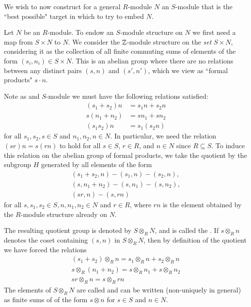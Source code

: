 \documentclass[12pt, a4paper, oneside, openright, titlepage]{book}
\begin{document}
We wish to now construct for a general $R$-module $N$ an $S$-module that is the ``best possible" target in which to try to embed $N$.

\begin{cons}
    Let $N$ be an $R$-module. To endow an $S$-module structure on $N$ we first need a map from $S\times N$ to $N$. We consider the $\mathbb Z$-module structure on the \emph{set} $S\times N$, considering it as the collection of all finite commuting sums of elements of the form $(s_i,n_i) \in S\times N$. This is an abelian group where there are no relations between any distinct pairs $(s,n)$ and $(s',n')$, which we view as ``formal products" $s\cdot n$. 

    Note as and $S$-module we must have the following relations satisfied: \begin{align*}
        (s_1+s_2)n &= s_1n+s_2n \\
        s(n_1+n_2) &= sn_1+sn_2 \\
        (s_1s_2)n &= s_1(s_2n)
    \end{align*}
    for all $s_1,s_2,s \in S$ and $n_1,n_2,n \in N$. In particular, we need the relation $(sr)n = s(rn)$ to hold for all $s \in S$, $r \in R$, and $n \in N$ since $R \subseteq S$. To induce this relation on the abelian group of formal products, we take the quotient by the subgroup $H$ generated by all elements of the form \begin{equation*}
        \begin{array}{c}
            (s_1+s_2,n) - (s_1,n) - (s_2,n), \\
            (s,n_1+n_2) - (s,n_1) - (s,n_2), \\
            (sr,n) - (s,rn) 
        \end{array}
    \end{equation*}
    for all $s,s_1,s_2 \in S, n, n_1,n_2 \in N$ and $r \in R$, where $rn$ is the element obtained by the $R$-module structure already on $N$.


    The resulting quotient group is denoted by $S\otimes_R N$, and is called the . If $s\otimes_R n$ denotes the coset containing $(s,n)$ in $S\otimes_R N$, then by definition of the quotient we have forced the relations \begin{equation*}
        \begin{array}{c}
            (s_1+s_2)\otimes_Rn = s_1\otimes_R n + s_2\otimes_R n \\
            s\otimes_R(n_1+n_2) = s\otimes_R n_1+s\otimes_Rn_2 \\
            sr\otimes_R n = s\otimes_Rrn
        \end{array}
    \end{equation*}
    The elements of $S\otimes_RN$ are called  and can be written (non-uniquely in general) as finite sums of  of the form $s\otimes n$ for $s \in S$ and $n \in N$.


\end{cons}
\end{document}
